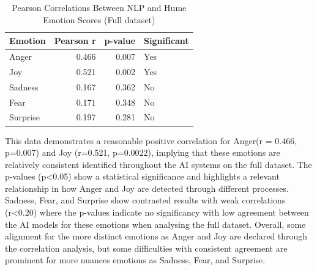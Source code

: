 \begin{table}[H]
    \centering
    \caption*{\textbf{All recordings}}
    \begin{tabular}{lrrl}
      \toprule
      \textbf{Emotion} & \textbf{Pearson r} & \textbf{p-value} & \textbf{Significant}\\
      \midrule
      Anger    & 0.466 & 0.007 & Yes \\
      Joy      & 0.521 & 0.002 & Yes \\
      Sadness  & 0.167 & 0.362 & No  \\
      Fear     & 0.171 & 0.348 & No  \\
      Surprise & 0.197 & 0.281 & No  \\
      \bottomrule
    \end{tabular}
    \caption{Pearson Correlations Between NLP and Hume Emotion Scores (Full dataset)}
    \label{tab:corr_all}
  \end{table}

This data demonstrates a reasonable positive correlation for Anger(r = 0.466, p=0.007) and Joy (r=0.521, p=0.0022), implying that these emotions are relatively consistent identified throughout the AI systems on the full dataset. 
The p-values (p<0.05) show a statistical significance and highlights a relevant relationship in how Anger and Joy are detected through different processes. 
Sadness, Fear, and Surprise show contrasted results with weak correlations (r<0.20) where the p-values indicate no significancy with low agreement between the AI models for these emotions when analysing the full dataset. 
Overall, some alignment for the more distinct emotions as Anger and Joy are declared through the correlation analysis, but some difficulties with consistent agreement are prominent for more nuances emotions as Sadness, Fear, and Surprise. 

